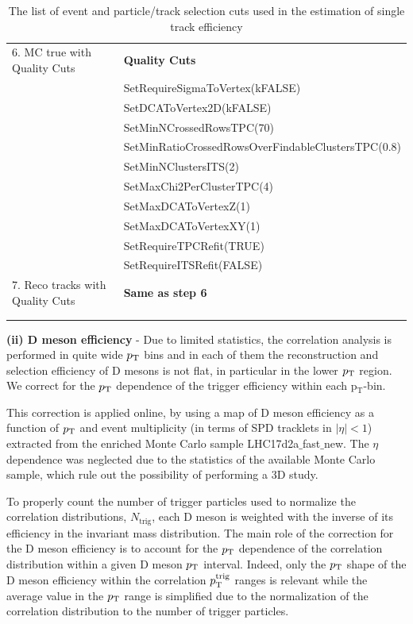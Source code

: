 \begin{table}[h]
\begin{tabular}{  p{5cm} |  p{8.5cm} }
6. MC true with Quality Cuts         &      			      {\textbf  {Quality Cuts }} \\
																	&SetRequireSigmaToVertex(kFALSE) \\
																	&SetDCAToVertex2D(kFALSE) \\
																	&SetMinNCrossedRowsTPC(70)\\
																	&SetMinRatioCrossedRowsOverFindableClustersTPC(0.8)\\
																	&SetMinNClustersITS(2)\\
																	&SetMaxChi2PerClusterTPC(4)\\
																	&SetMaxDCAToVertexZ(1) \\
																	&SetMaxDCAToVertexXY(1) \\
																	&SetRequireTPCRefit(TRUE) \\
																	&SetRequireITSRefit(FALSE) \\

7. Reco tracks with Quality Cuts         &             {\textbf  {Same as step 6}} \\

 &\\		            	            		

 \hline \hline
 \\
\end{tabular}
\caption{\large {The list of event and particle/track selection cuts used in the estimation of single track efficiency}} %
\label{table:effCuts}	
\end{table}

{\bf \large (ii) D meson efficiency} - Due to limited statistics, the correlation analysis is performed in quite wide $p_{\rm T}$ bins and in each of them the reconstruction and selection efficiency of D mesons is not flat, in particular in the lower $p_{\rm T}$ region. We correct for the $p_{\rm T}$ dependence of the trigger efficiency within each p$_\mathrm{T}$-bin.

This correction is applied online, by using a map of D meson efficiency as a function of $p_{\rm T}$ and event multiplicity (in terms of SPD tracklets in $|\eta|<1$) extracted from the enriched Monte Carlo sample LHC17d2a$\_$fast$\_$new. The $\eta$ dependence was neglected due to the statistics of the available Monte Carlo sample, which rule out the possibility of performing a 3D study.

To properly count the number of trigger particles used to normalize the correlation distributions, $N_\text{trig}$, each D meson is weighted with the inverse of its efficiency
in the invariant mass distribution. The main role of the correction for the D meson efficiency is to account for the $p_{\rm T}$ dependence of the correlation distribution within a given D meson $p_{\rm T}$ interval. Indeed, only the $p_{\rm T}$ shape of the D meson efficiency within the correlation $p_{\rm T}^{\rm trig}$ ranges is relevant while the average value
in the $p_{\rm T}$ range is simplified due to the normalization of the correlation distribution to the number of trigger particles.

